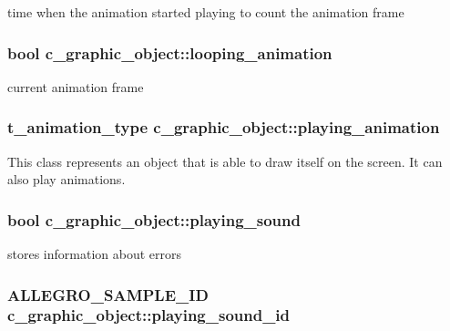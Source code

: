 time when the animation started playing to count the animation frame \hypertarget{classc__graphic__object_a9b4e51cd726799f6d6902e1759719bbc}{
\subsubsection[{looping\-\_\-animation}]{\setlength{\rightskip}{0pt plus 5cm}bool c\-\_\-graphic\-\_\-object\-::looping\-\_\-animation\hspace{0.3cm}{\ttfamily [protected]}}}\label{classc__graphic__object_a9b4e51cd726799f6d6902e1759719bbc}
current animation frame \hypertarget{classc__graphic__object_a3633db416c2709f2f65a858de7a2d9ae}{
\subsubsection[{playing\-\_\-animation}]{\setlength{\rightskip}{0pt plus 5cm}t\-\_\-animation\-\_\-type c\-\_\-graphic\-\_\-object\-::playing\-\_\-animation\hspace{0.3cm}{\ttfamily [protected]}}}\label{classc__graphic__object_a3633db416c2709f2f65a858de7a2d9ae}
This class represents an object that is able to draw itself on the screen. It can also play animations. \hypertarget{classc__graphic__object_a3994cab2b5b4fe62ca0c5b1bc2e03460}{
\subsubsection[{playing\-\_\-sound}]{\setlength{\rightskip}{0pt plus 5cm}bool c\-\_\-graphic\-\_\-object\-::playing\-\_\-sound\hspace{0.3cm}{\ttfamily [protected]}}}\label{classc__graphic__object_a3994cab2b5b4fe62ca0c5b1bc2e03460}
stores information about errors \hypertarget{classc__graphic__object_abf8bc08bd583d2fd1209eba2ae0fdebf}{
\subsubsection[{playing\-\_\-sound\-\_\-id}]{\setlength{\rightskip}{0pt plus 5cm}A\-L\-L\-E\-G\-R\-O\-\_\-\-S\-A\-M\-P\-L\-E\-\_\-\-I\-D c\-\_\-graphic\-\_\-object\-::playing\-\_\-sound\-\_\-id\hspace{0.3cm}{\ttfamily [protected]}}}\label{classc__graphic__object_abf8bc08bd583d2fd1209eba2ae0fdebf}
